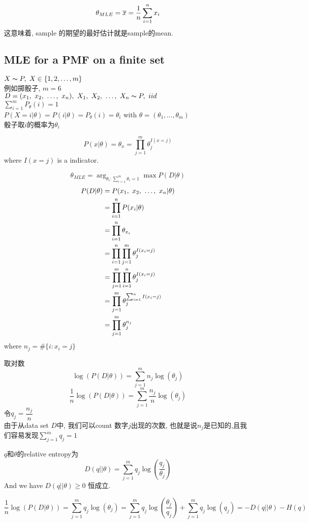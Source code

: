\documentclass{article}
\begin{document}
$$\theta_{MLE} = \overline{x} = \dfrac{1}{n} \sum_{i=1}^n x_i$$
这意味着, sample 的期望的最好估计就是sample的mean.

\subsection{MLE for a PMF on a finite  set}
$X \thicksim{P},\ X \in \{1,2,\ldots, m\}$\\
例如掷骰子, $m=6$\\
$D = (\vector{x}),\ \vector{X} \obey P,\ iid$\\
$\sum_{i=1}^m P_\theta(i) = 1$\\
$P(X=i|\theta) = P(i|\theta) = P_\theta(i) = \theta_i$ with $\theta = (\theta_1, \ldots, \theta_m)$\\
骰子取$i$的概率为$\theta_i$

$$P(x|\theta) = \theta_x= \prod_{j= 1}^m \theta_j^{I(x=j)}$$
where $I(x=j)$ is a indicator.

$$\theta_{MLE} = \arg_{\theta_i: \sum_{i=1}^m \theta_i =1} \max P(D|\theta)$$
$$
\begin{aligned}
P(D|\theta)
& = P(x_1,~x_2,~\ldots,~x_n| \theta) \\
& = \prod_{i=1}^n P(x_i|\theta) \\
& = \prod_{i=1}^n \theta_{x_i}\\
& = \prod_{i=1}^n \prod_{j=1}^m \theta_j^{I(x_i = j)}\\
& = \prod_{j=1}^m \prod_{i=1}^n \theta_j^{I(x_i = j)}\\
& = \prod_{j=1}^m \theta_j^{ \sum_{i=1}^n I(x_i = j)}\\
& = \prod_{j=1}^m \theta_j^{n_j}\\
\end{aligned}
$$
where $n_j = \#\{i: x_i = j\}$

取对数
$$ \log(P(D|\theta)) = \sum_{j=1}^m n_j \log(\theta_j) $$
$$ \dfrac{1}{n} \log(P(D|\theta)) = \sum_{j=1}^m \dfrac{n_j}{n} \log(\theta_j) $$
令$q_j = \dfrac{n_j}{n} $\\
由于从data set $D$中, 我们可以count 数字$j$出现的次数, 也就是说$n_j$是已知的,且我们容易发现$\sum_{j=1}^m q_j = 1$

$q$和$\theta$的relative entropy为
$$D(q||\theta) = \sum_{j=1}^m q_j \log(\dfrac{q_j}{\theta_j})$$
And we have $D(q||\theta) \geq 0$ 恒成立.

$$
\dfrac{1}{n} \log(P(D|\theta))
= \sum_{j=1}^m q_j \log(\theta_j)
= \sum_{j=1}^m q_j \log(\dfrac{\theta_j}{q_j}) + \sum_{j=1}^m q_j \log(q_j)
= -D(q||\theta) - H(q)
$$
\end{document}
